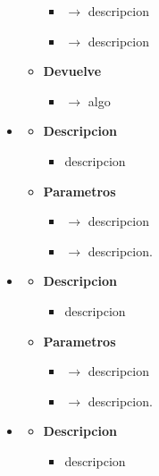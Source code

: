 \begin{itemize}
\begin{itemize}
\begin{itemize}
            \item {} $\rightarrow$ descripcion
            \item {} $\rightarrow$ descripcion
		\end{itemize}
        \item \textbf{Devuelve}
		\begin{itemize}
			\item {} $\rightarrow$ algo
		\end{itemize}
	\end{itemize}
    \item{}
	\begin{itemize}
		\item \textbf{Descripcion}
        \begin{itemize}
			\item descripcion
		\end{itemize}
        \item \textbf{Parametros}
		\begin{itemize}
			\item {} $\rightarrow$ descripcion
            \item {} $\rightarrow$ descripcion.
		\end{itemize}
	\end{itemize}
    \newpage
    \item{}
	\begin{itemize}
		\item \textbf{Descripcion}
        \begin{itemize}
			\item descripcion
		\end{itemize}
        \item \textbf{Parametros}
		\begin{itemize}
			\item {} $\rightarrow$ descripcion
            \item {} $\rightarrow$ descripcion.
		\end{itemize}
	\end{itemize}
   \item{}
	\begin{itemize}
		\item \textbf{Descripcion}
        \begin{itemize}
			\item descripcion

\end{itemize}
\end{itemize}
\end{itemize}
